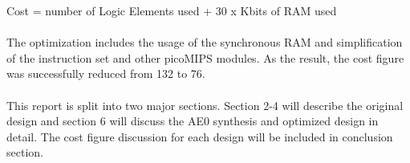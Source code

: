                     Cost = number of Logic Elements used + 30 x Kbits of RAM used\\\\
The optimization includes the usage of the synchronous RAM and simplification of the instruction set and other picoMIPS modules. As the result, the cost figure was successfully reduced from 132 to 76.\\\\
This report is split into two major sections. Section 2-4 will describe the original design and section 6 will discuss the AE0 synthesis and optimized design in detail. The cost figure discussion for each design will be included in conclusion section.


